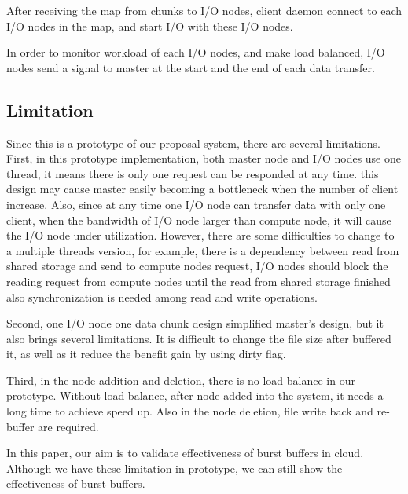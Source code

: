 After receiving the map from chunks to I/O nodes, client daemon connect to each I/O
nodes in the map, and start I/O with these I/O nodes.

In order to monitor workload of each I/O nodes, and make load balanced, I/O nodes send a signal to
master at the start and the end of each data transfer.

\subsection{Limitation}

Since this is a prototype of our proposal system, there are several limitations.
First, in this prototype implementation, both master node and I/O nodes use one thread, it means
there is only one request can be responded at any time.
this design may cause master easily becoming a bottleneck when the number of client increase.
Also, since at any time one I/O node can transfer data with only one client, when the bandwidth of
I/O node larger than compute node, it will cause the I/O node under utilization.
However, there are some difficulties to change to a multiple threads version, for example, there
is a dependency between read from shared storage and send to compute nodes request, I/O nodes should
block the reading request from compute nodes until the read from shared storage finished also
synchronization is needed among read and write operations.

Second, one I/O node one data chunk design simplified master's design, but it also brings several
limitations. It is difficult to change the file size after buffered it, as well as it reduce the
benefit gain by using dirty flag.

Third, in the node addition and deletion, there is no load balance in our prototype.
Without load balance, after node added into the system, it needs a long time to achieve speed up.
Also in the node deletion, file write back and re-buffer are required.

In this paper, our aim is to validate effectiveness of burst buffers in
cloud.
Although we have these limitation in prototype, we can still show the effectiveness of burst
buffers.

